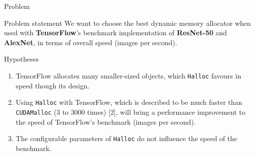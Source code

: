 \documentclass[10pt]{beamer}
\begin{document}



\begin{frame}[fragile]{Problem}


\begin{alertblock}{Problem statement}
 We want to choose the best dynamic memory allocator when used with \textbf{TensorFlow}'s benchmark implementation of \textbf{ResNet-50} and \textbf{AlexNet}, in terms of overall speed (images per second).
\end{alertblock}

\begin{exampleblock}{Hypotheses}
\begin{enumerate}
\item TensorFlow allocates many smaller-sized objects, which \texttt{Halloc} favours in speed though its design.
\item Using \texttt{Halloc} with TensorFlow, which is described to be much faster than \texttt{CUDAMalloc} (3 to 3000 times) [2], will bring a performance improvement to the speed of TensorFlow's benchmark (images per second).
\item The configurable parameters of \texttt{Halloc} do not influence the speed of the benchmark.
\end{enumerate}

\end{exampleblock}


\end{frame}
\end{document}
